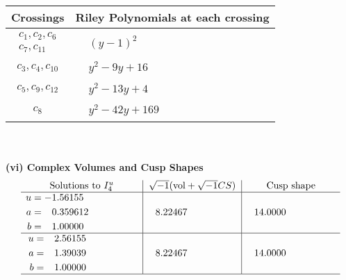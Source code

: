 \documentclass[1p]{elsarticle_modified}
\theoremstyle{definition}
\newcommand{\I}{\sqrt{-1}}
\begin{document}
\begin{tabular}{m{50pt}|m{274pt}}
Crossings & \hspace{64pt}Riley Polynomials at each crossing \\
\hline $$\begin{aligned}c_{1},c_{2},c_{6}\\c_{7},c_{11}\end{aligned}$$&$\begin{aligned}
&(y-1)^2
\end{aligned}$\\
\hline $$\begin{aligned}c_{3},c_{4},c_{10}\end{aligned}$$&$\begin{aligned}
&y^2-9 y+16
\end{aligned}$\\
\hline $$\begin{aligned}c_{5},c_{9},c_{12}\end{aligned}$$&$\begin{aligned}
&y^2-13 y+4
\end{aligned}$\\
\hline $$\begin{aligned}c_{8}\end{aligned}$$&$\begin{aligned}
&y^2-42 y+169
\end{aligned}$\\
\hline
\end{tabular}\\~\\
\newpage\flushleft \textbf{(vi) Complex Volumes and Cusp Shapes}
$$\begin{array}{c|c|c}  
\text{Solutions to }I^u_{4}& \I (\text{vol} + \sqrt{-1}CS) & \text{Cusp shape}\\
 \hline 
\begin{aligned}
u &= -1.56155\phantom{ +0.000000I} \\
a &= \phantom{-}0.359612\phantom{ +0.000000I} \\
b &= \phantom{-}1.00000\phantom{ +0.000000I}\end{aligned}
 & \phantom{-}8.22467\phantom{ +0.000000I} & \phantom{-}14.0000\phantom{ +0.000000I} \\ \hline\begin{aligned}
u &= \phantom{-}2.56155\phantom{ +0.000000I} \\
a &= \phantom{-}1.39039\phantom{ +0.000000I} \\
b &= \phantom{-}1.00000\phantom{ +0.000000I}\end{aligned}
 & \phantom{-}8.22467\phantom{ +0.000000I} & \phantom{-}14.0000\phantom{ +0.000000I}\\
 \hline 
 \end{array}$$\newpage\newpage\renewcommand{\arraystretch}{1}
\end{document}
